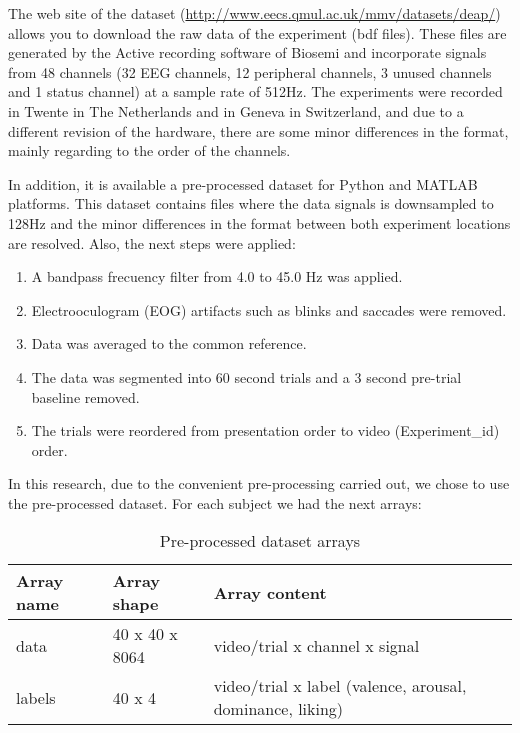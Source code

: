 \documentclass{sig-alternate}
\begin{document}
The web site of the dataset (\url{http://www.eecs.qmul.ac.uk/mmv/datasets/deap/}) allows you to download the raw data of the experiment (bdf files). These files are generated by the Active recording software of Biosemi and incorporate signals from 48 channels (32 EEG channels, 12 peripheral channels, 3 unused channels and 1 status channel) at a sample rate of 512Hz. The experiments were recorded in Twente in The Netherlands and in Geneva in Switzerland, and due to a different revision of the hardware, there are some minor differences in the format, mainly regarding to the order of the channels.
    
In addition, it is available a pre-processed dataset for Python and MATLAB platforms. This dataset contains files where the data signals is downsampled to 128Hz and the minor differences in the format between both experiment locations are resolved. Also, the next steps were applied:
\begin{enumerate}
\item A bandpass frecuency filter from 4.0 to 45.0 Hz was applied.
\item Electrooculogram (EOG) artifacts such as blinks and saccades were removed.
\item Data was averaged to the common reference.
\item The data was segmented into 60 second trials and a 3 second pre-trial baseline removed.
\item The trials were reordered from presentation order to video (Experiment\_id) order.
\end{enumerate} 

In this research, due to the convenient pre-processing carried out, we chose to use the pre-processed dataset. For each subject we had the next arrays:

\begin{table}[h!]
\footnotesize
\begin{center}
\begin{tabular}{|p{1cm}|p{2cm}|p{4.5cm}|}
      	\hline 
      	Array name & Array shape & Array content \\ 
      	\hline 
      	data & 40 x 40 x 8064 & video/trial x channel x signal \\ 
      	\hline
      	labels & 40 x 4 & video/trial x label (valence, arousal, dominance, liking) \\ 
      	\hline 
\end{tabular} 
\end{center}
\caption{Pre-processed dataset arrays}
\label{tab:dataset}
\end{table}       	
	
\end{document}
